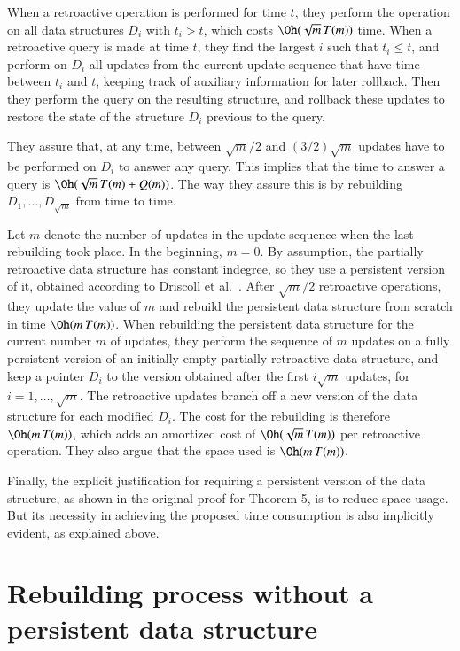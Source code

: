 \documentclass[3p,times,procedia]{elsarticle}
\begin{document}
When a retroactive operation is performed for time $t$, they perform the operation 
on all data structures $D_i$ with $t_i>t$, which costs $\Oh(\sqrt{m}\,T(m))$ time.  
When a retroactive query is made at time $t$, they find the largest $i$ such that 
$t_i \leq t$, and perform on $D_i$ all updates from the current update sequence that 
have time between $t_i$ and $t$, keeping track of auxiliary information for later rollback. 
Then they perform the query on the resulting structure, and rollback these 
updates to restore the state of the structure $D_i$ previous to the query.

They assure that, at any time, between $\sqrt{m}/2$ and $(3/2)\sqrt{m}$ 
updates have to be performed on $D_i$ to answer any query.  
This implies that the time to answer a query is $\Oh(\sqrt{m}\,T(m)+Q(m))$.  
The way they assure this is by rebuilding $D_1,\ldots,D_{\sqrt{m}}$ from time to time. 

Let $m$ denote the number of updates in the update sequence when the last rebuilding took place.
In the beginning, $m=0$. 
By assumption, the partially retroactive data structure has constant indegree, so they use 
a persistent version of it, obtained according to Driscoll et al.~\cite{DriscollSST1989}.
After $\sqrt{m}/2$ retroactive operations, they update the value of $m$ and 
rebuild the persistent data structure from scratch in time $\Oh(m\,T(m))$. 
When rebuilding the persistent data structure for the current number $m$ of updates, 
they perform the sequence of $m$ updates on a fully persistent version of an 
initially empty partially retroactive data structure, and keep a pointer $D_i$ 
to the version obtained after the first $i\sqrt{m}$ updates, for $i = 1,\ldots,\sqrt{m}$. 
The retroactive updates branch off 
a new version of the data structure for each modified $D_i$.  
The cost for the rebuilding is therefore $\Oh(m\,T(m))$, 
which adds an amortized cost of $\Oh(\sqrt{m}\,T(m))$ per retroactive operation. 
They also argue that the space used is $\Oh(m\,T(m))$.

Finally, the explicit justification for requiring a persistent version of the data structure, 
as shown in the original proof for Theorem 5, is to reduce space usage. But its necessity in 
achieving the proposed time consumption is also implicitly evident, as explained above.

\section{Rebuilding process without a persistent data structure}\label{sec:rebuilding}
\end{document}
